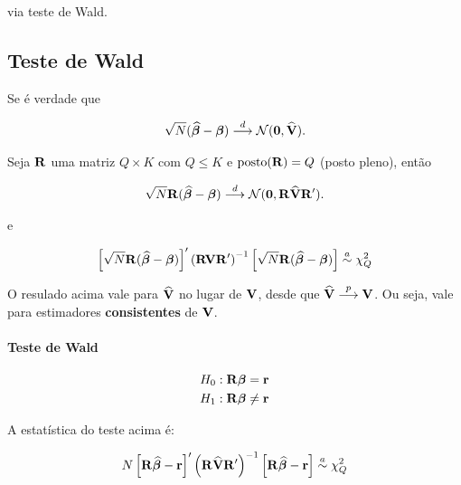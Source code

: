 \documentclass[11pt, oneside, a4paper, article]{article}
\numberwithin{equation}{section}
\begin{document}
\noindent
via teste de Wald.

\subsection{Teste de Wald}

Se é verdade que

\vspace{-1 em}
\begin{align*}
	\sqrt{N} (\widehat{\boldsymbol{\beta}} - \boldsymbol{\beta}) 
	 \overset{d}{\longrightarrow} 
	\mathcal{N}(\boldsymbol{0}, \widehat{\mathbf{V}}).
\end{align*}

\noindent
Seja $\mathbf{R}$ uma matriz $Q \times K$ com $Q \leq K$ e $\text{posto}(\mathbf{R}) = Q$ (posto pleno), então

\vspace{-1 em}
\begin{align*}
	\sqrt{N} \mathbf{R} (\widehat{\boldsymbol{\beta}} - \boldsymbol{\beta}) 
	 \overset{d}{\longrightarrow} 
	\mathcal{N}(\boldsymbol{0}, \mathbf{R} \widehat{\mathbf{V}} \mathbf{R}').
\end{align*}

e

\vspace{-1 em}
\begin{align*}
	\left[ \sqrt{N} \mathbf{R} (\widehat{\boldsymbol{\beta}} - \boldsymbol{\beta})  \right]'
	\left( \mathbf{R} \mathbf{V} \mathbf{R}' \right)^{-1}
	\left[ \sqrt{N} \mathbf{R} (\widehat{\boldsymbol{\beta}} - \boldsymbol{\beta})  \right]
	\overset{a}{\sim}
	\chi^{2}_{Q} 
\end{align*}

O resulado acima vale para $\widehat{\mathbf{V}}$ no lugar de $\mathbf{V}$, desde que $\widehat{\mathbf{V}}  \overset{p}{\longrightarrow}  \mathbf{V}$.
Ou seja, vale para estimadores \textbf{consistentes} de $\mathbf{V}$.

\paragraph{Teste de Wald}

\begin{align*}
H_{0} &: \mathbf{R} \boldsymbol{\beta} = \mathbf{r}
\\
H_{1} &: \mathbf{R} \boldsymbol{\beta} \neq \mathbf{r}
\end{align*}

A estatística do teste acima é:

\vspace{-1 em}
\begin{align*}
	N
	\left[ \mathbf{R} \widehat{\boldsymbol{\beta}} - \mathbf{r}  \right]'
	\left( \mathbf{R} \widehat{\mathbf{V}} \mathbf{R}' \right)^{-1}
	\left[ \mathbf{R} \widehat{\boldsymbol{\beta}} - \mathbf{r}  \right]
	\overset{a}{\sim}
	\chi^{2}_{Q} 
\end{align*}
\end{document}
